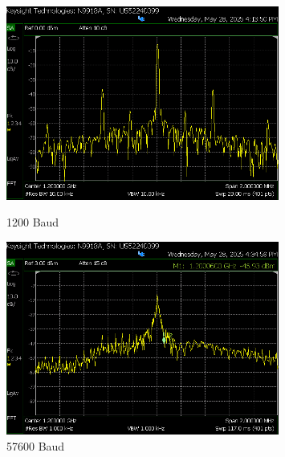     \begin{figure}[H]
        \centering
        \begin{minipage}{0.47\textwidth}
            \centering
            \includegraphics[width=0.8\textwidth]{Pictures/4.4C.1200.png}
            \caption*{1200 Baud}
        \end{minipage}
        \hfill
        \begin{minipage}{0.47\textwidth}
            \centering
            \includegraphics[width=0.8\textwidth]{Pictures/4.4C.57600.png}
            \caption*{57600 Baud}
        \end{minipage}

        \vspace{0.5cm}


\end{figure}
